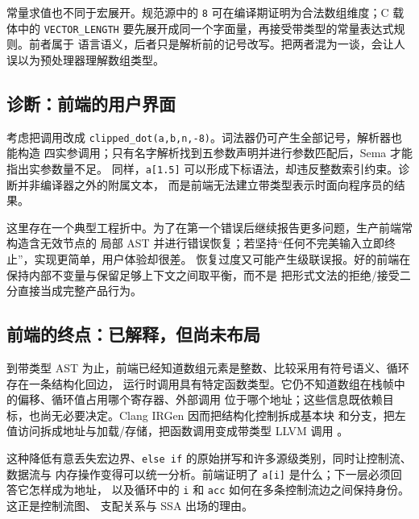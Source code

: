 常量求值也不同于宏展开。规范源中的 \texttt{8} 可在编译期证明为合法数组维度；C 载体中的
\texttt{VECTOR\_LENGTH} 要先展开成同一个字面量，再接受带类型的常量表达式规则。前者属于
语言语义，后者只是解析前的记号改写。把两者混为一谈，会让人误以为预处理器理解数组类型。

\subsection{诊断：前端的用户界面}

考虑把调用改成 \texttt{clipped\_dot(a,b,n,-8)}。词法器仍可产生全部记号，解析器也能构造
四实参调用；只有名字解析找到五参数声明并进行参数匹配后，Sema 才能指出实参数量不足。
同样，\texttt{a[1.5]} 可以形成下标语法，却违反整数索引约束。诊断并非编译器之外的附属文本，
而是前端无法建立带类型表示时面向程序员的结果。

这里存在一个典型工程折中。为了在第一个错误后继续报告更多问题，生产前端常构造含无效节点的
局部 AST 并进行错误恢复；若坚持“任何不完美输入立即终止”，实现更简单，用户体验却很差。
恢复过度又可能产生级联误报。好的前端在保持内部不变量与保留足够上下文之间取平衡，而不是
把形式文法的拒绝/接受二分直接当成完整产品行为。

\subsection{前端的终点：已解释，但尚未布局}

到带类型 AST 为止，前端已经知道数组元素是整数、比较采用有符号语义、循环存在一条结构化回边，
运行时调用具有特定函数类型。它仍不知道数组在栈帧中的偏移、循环值占用哪个寄存器、外部调用
位于哪个地址；这些信息既依赖目标，也尚无必要决定。Clang IRGen 因而把结构化控制拆成基本块
和分支，把左值访问拆成地址与加载/存储，把函数调用变成带类型 LLVM 调用
\cite{front-lattner-adve}。

这种降低有意丢失宏边界、\texttt{else if} 的原始拼写和许多源级类别，同时让控制流、数据流与
内存操作变得可以统一分析。前端证明了 \texttt{a[i]} 是什么；下一层必须回答它怎样成为地址，
以及循环中的 \texttt{i} 和 \texttt{acc} 如何在多条控制流边之间保持身份。这正是控制流图、
支配关系与 SSA 出场的理由。
